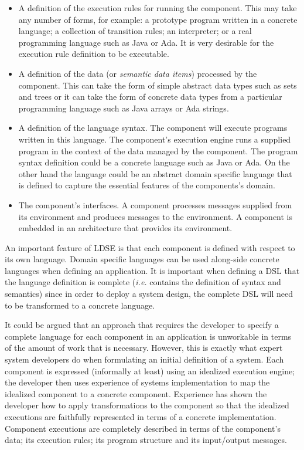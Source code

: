 \documentclass{article}
\begin{document}
\begin{itemize}

\item A definition of the execution rules for running the component. This may take
any number of forms, for example: a prototype program written in a concrete language;
a collection of transition rules; an interpreter; or a real programming language such
as Java or Ada. It is very desirable for the execution rule definition to be executable.

\item A definition of the data (or {\em semantic data items}) processed by the
component. This can take the form of simple abstract data types such as sets and
trees or it can take the form of concrete data types from a particular programming
language such as Java arrays or Ada strings.

\item A definition of the language syntax. The component will execute programs written
in this language. The component's execution engine runs a supplied program in the context
of the data managed by the component. The program syntax definition could be a concrete
language such as Java or Ada. On the other hand the language could be an abstract domain
specific language that is defined to capture the essential features of the components's
domain.

\item The component's interfaces. A component processes messages supplied from its
environment and produces messages to the environment. A component is embedded in an
architecture that provides its environment.

\end{itemize}
An important feature of LDSE is that each component is defined with respect to
its own language. Domain specific languages can be used along-side concrete languages when
defining an application. It is important when defining a DSL that the language definition
is complete ({\em i.e.} contains the definition of syntax and semantics) since in 
order to deploy a system design, the complete DSL will need to be transformed to a concrete
language.

It could be argued that an approach that requires the developer to specify a complete
language for each component in an application is unworkable in terms of the amount
of work that is necessary. However, this is exactly what expert system developers do
when formulating an initial definition of a system. Each component is expressed (informally
at least) using an idealized execution engine; the developer then uses experience of
systems implementation to map the idealized component to a concrete component. Experience
has shown the developer how to apply transformations to the component so that
the idealized executions are faithfully represented in terms of a concrete implementation.
Component executions are completely described in terms of the component's data; its 
execution rules; its program structure and its input/output messages.
\end{document}
